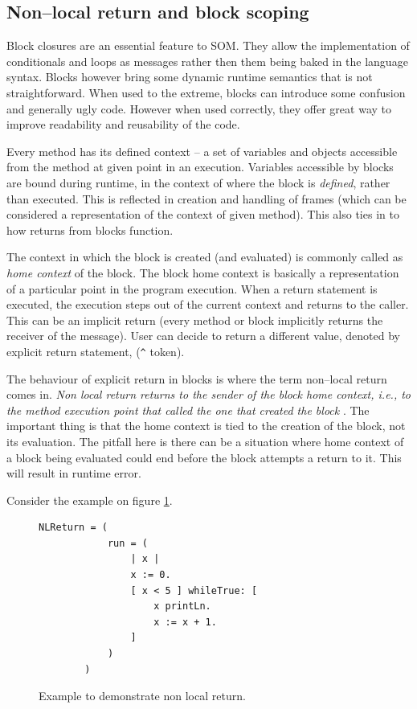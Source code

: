 \documentclass[thesis=M,english]{FITthesis}[2019/12/23]
\begin{document}
\subsection{Non--local return and block scoping}
\label{subsection:nlret}
Block closures are an essential feature to SOM. They allow the implementation of conditionals and loops as messages
rather then them being baked in the language syntax. Blocks however bring some dynamic runtime semantics that is not
straightforward. When used to the extreme, blocks can introduce some confusion and generally ugly code. However when
used correctly, they offer great way to improve readability and reusability of the code.

Every method has its defined context -- a set of variables and objects accessible from the method at given point in an
execution. Variables accessible by blocks are bound during runtime, in the context of where the block is \textit{defined},
rather than executed. This is reflected in creation and handling of frames (which can be considered a representation of
the context of given method). This also ties in to how returns from blocks function.

The context in which the block is created (and evaluated) is commonly called as \textit{home context} of the block.
The block home context is basically a representation of a particular point in the program execution. When a return
statement is executed, the execution steps out of the current context and returns to the caller. This can be
an implicit return (every method or block implicitly returns the receiver of the message). User can decide to
return a different value, denoted by explicit return statement, (\texttt{\^} token).

The behaviour of explicit return in blocks is where the term non--local return comes in. \textit{Non local return returns
to the sender of the block home context, i.e., to the method execution point that called the one that created the block}
\cite{pharo-blocks}. The important thing is that the home context is tied to the creation of the block, not its
evaluation. The pitfall here is there can be a situation where home context of a block being evaluated could end before
the block attempts a return to it. This will result in runtime error.

Consider the example on figure \ref{fig:nlreturn_1}.

\begin{figure}[h!]
	\centering
	\begin{lstlisting}[language=Smalltalk]
		NLReturn = (
			run = (
				| x |
				x := 0.
				[ x < 5 ] whileTrue: [
					x printLn.
					x := x + 1.
				]
			)
		)
	\end{lstlisting}
	\caption{Example to demonstrate non local return.}
	\label{fig:nlreturn_1}
\end{figure}
\end{document}
